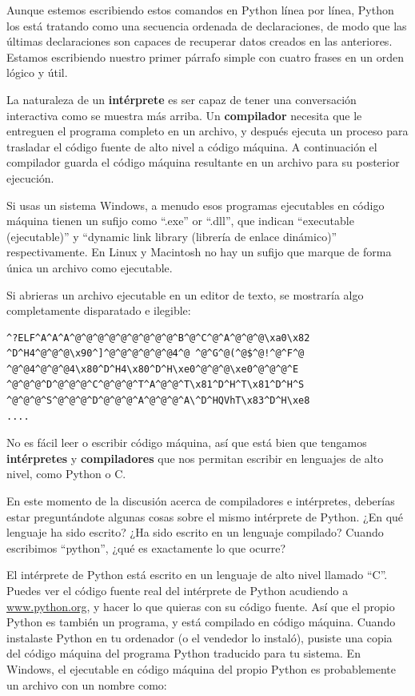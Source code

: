 Aunque estemos escribiendo estos comandos en Python línea por línea, Python
los está tratando como una secuencia ordenada de declaraciones, de modo
que las últimas declaraciones son capaces de recuperar datos creados en las
anteriores. Estamos escribiendo nuestro primer párrafo simple con cuatro frases
en un orden lógico y útil.

La naturaleza de un {\bf intérprete} es ser capaz de tener una conversación interactiva como se muestra más arriba. Un {\bf compilador} necesita que le entreguen el programa
completo en un archivo, y después
ejecuta un proceso para trasladar el código fuente de alto nivel a código máquina.
A continuación el compilador guarda el código máquina resultante en un archivo para su
posterior ejecución. 

Si usas un sistema Windows, a menudo esos programas ejecutables en código máquina tienen un sufijo como ``.exe'' or ``.dll'', que indican ``executable (ejecutable)'' y ``dynamic
link library (librería de enlace dinámico)'' respectivamente. En Linux y Macintosh
no hay un sufijo que marque de forma única un archivo como ejecutable.

Si abrieras un archivo ejecutable en un editor de texto, se mostraría algo
completamente disparatado e ilegible:

\beforeverb
\begin{verbatim}
^?ELF^A^A^A^@^@^@^@^@^@^@^@^@^B^@^C^@^A^@^@^@\xa0\x82
^D^H4^@^@^@\x90^]^@^@^@^@^@^@4^@ ^@^G^@(^@$^@!^@^F^@
^@^@4^@^@^@4\x80^D^H4\x80^D^H\xe0^@^@^@\xe0^@^@^@^E
^@^@^@^D^@^@^@^C^@^@^@^T^A^@^@^T\x81^D^H^T\x81^D^H^S
^@^@^@^S^@^@^@^D^@^@^@^A^@^@^@^A\^D^HQVhT\x83^D^H\xe8
....
\end{verbatim}
\afterverb
%
No es fácil leer o escribir código máquina, así que está bien que tengamos
{\bf intérpretes} y {\bf compiladores} que nos permitan escribir en lenguajes
de alto nivel, como Python o C.

En este momento de la discusión acerca de compiladores e intérpretes, deberías
estar preguntándote algunas cosas sobre el mismo intérprete de Python. ¿En qué
lenguaje ha sido escrito? ¿Ha sido escrito en un lenguaje compilado? Cuando escribimos ``python'', ¿qué es exactamente lo que ocurre?

El intérprete de Python está escrito en un lenguaje de alto nivel llamado ``C''.
Puedes ver el código fuente real del intérprete de Python acudiendo a
\url{www.python.org}, y hacer lo que quieras con su código fuente.
Así que el propio Python es también un programa, y está compilado en código máquina.
Cuando instalaste Python en tu ordenador (o el vendedor lo instaló),
pusiste una copia del código máquina del programa Python traducido para tu sistema.
En Windows, el ejecutable en código máquina del propio Python es probablemente
un archivo con un nombre como:

